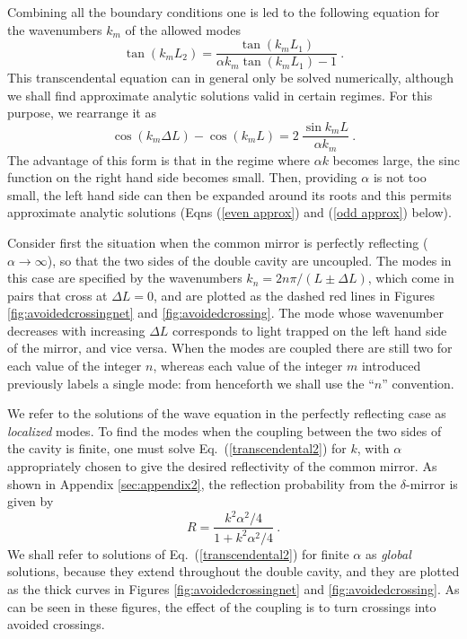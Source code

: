 \documentclass[twocolumn,english,pra,aps,superscriptaddress,floatfix]{revtex4-1}
\begin{document}
Combining all the boundary conditions one is led to the following equation
for the wavenumbers $k_{m}$ of the allowed modes \cite{lang73}
\begin{equation}
\tan(k_{m} L_{2})=\frac{\tan(k_{m} L_{1})}{\alpha k_{m} \tan(k_{m} L_{1})-1} \ .
\label{transcendental1}
\end{equation}
This transcendental equation can in general only be solved numerically, although we shall find approximate analytic solutions valid in certain regimes. For this purpose, we rearrange it as
\begin{equation}
\cos(k_{m} \Delta L)-\cos(k_{m} L)=2 \ \frac{\sin k_{m} L}{\alpha k_{m}} \ .
\label{transcendental2}
\end{equation}
The advantage of this form is that in the regime where $\alpha k$ becomes large, the sinc function on the right hand side becomes small. Then, providing $\alpha$ is not too small, the left hand side can then be expanded around its roots and this permits approximate analytic solutions (Eqns (\ref{even approx}) and (\ref{odd approx}) below).



Consider first the situation when the common mirror is perfectly reflecting ($\alpha \rightarrow \infty$), so that the two sides of the double cavity are uncoupled. The modes in this case are specified by the wavenumbers $k_{n}=2 n \pi/ (L\pm \Delta L)$, which come in pairs  that cross at $\Delta L=0$, and are plotted as the dashed red lines in Figures \ref{fig:avoidedcrossingnet} and \ref{fig:avoidedcrossing}. The mode whose wavenumber decreases with increasing $\Delta L$ corresponds to light trapped on the left hand side of the mirror, and vice versa. 
When the modes are coupled there are still two for each value of the integer $n$, whereas each value of the integer $m$ introduced previously labels a single mode: from henceforth we shall use the ``$n$'' convention. 

We refer to the solutions of the wave equation in the perfectly reflecting case as \emph{localized} modes.
To find the modes when the coupling between the two sides of the cavity is finite, one must solve Eq.\ (\ref{transcendental2}) for $k$, with $\alpha$ appropriately chosen to give the desired reflectivity of the common mirror. As shown in Appendix \ref{sec:appendix2}, the reflection probability from the $\delta$-mirror is given by
\begin{equation}
R  = \frac{k^2 \alpha^2 /4}{1+k^2 \alpha^2 /4} \ .
\label{eq:deltareflectivity}
\end{equation}
We shall refer to solutions of Eq.\ (\ref{transcendental2}) for finite $\alpha$ as \emph{global} solutions, because they extend throughout the double cavity, and they are plotted as the thick curves in Figures \ref{fig:avoidedcrossingnet} and \ref{fig:avoidedcrossing}. As can be seen in these figures, the effect of the coupling is to turn crossings into avoided crossings. 
\end{document}
